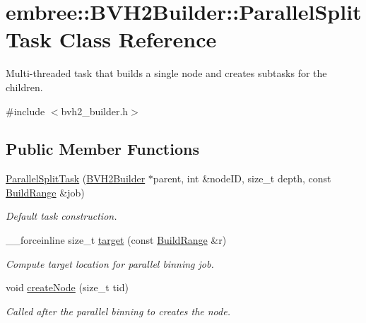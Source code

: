 \hypertarget{classembree_1_1_b_v_h2_builder_1_1_parallel_split_task}{
\section{embree::BVH2Builder::ParallelSplitTask Class Reference}
\label{classembree_1_1_b_v_h2_builder_1_1_parallel_split_task}
}


Multi-\/threaded task that builds a single node and creates subtasks for the children.  




{\ttfamily \#include $<$bvh2\_\-builder.h$>$}

\subsection*{Public Member Functions}
\begin{DoxyCompactItemize}
\item 
\hyperlink{classembree_1_1_b_v_h2_builder_1_1_parallel_split_task_aa7d41a2477517e3622ed2aa4204690ca}{ParallelSplitTask} (\hyperlink{classembree_1_1_b_v_h2_builder}{BVH2Builder} $\ast$parent, int \&nodeID, size\_\-t depth, const \hyperlink{structembree_1_1_build_range}{BuildRange} \&job)
\begin{DoxyCompactList}\small\item\em Default task construction. \item\end{DoxyCompactList}\item 
\_\-\_\-forceinline size\_\-t \hyperlink{classembree_1_1_b_v_h2_builder_1_1_parallel_split_task_af75fc64e4a75ab2e3b5488dc6e8dcb50}{target} (const \hyperlink{structembree_1_1_build_range}{BuildRange} \&r)
\begin{DoxyCompactList}\small\item\em Compute target location for parallel binning job. \item\end{DoxyCompactList}\item 
void \hyperlink{classembree_1_1_b_v_h2_builder_1_1_parallel_split_task_a3523df518aec16ead541abbc51c6b165}{createNode} (size\_\-t tid)
\begin{DoxyCompactList}\small\item\em Called after the parallel binning to creates the node. \item\end{DoxyCompactList}\end{DoxyCompactItemize}
